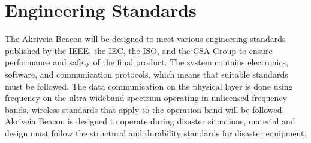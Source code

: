 
\setcounter{section}{2}
\section{Engineering Standards}
\bigskip

The Akriveia Beacon will be designed to meet various engineering standards published by the IEEE, the IEC, the ISO, and the CSA Group to ensure performance and safety of the final product. The system contains electronics, software, and communication protocols, which means that suitable standards must be followed. The data communication on the physical layer is done using frequency on the ultra-wideband spectrum operating in unlicensed frequency bands, wireless standards that apply to the operation band will be followed. Akriveia Beacon is designed to operate during disaster situations, material and design must follow the structural and durability standards for disaster equipment.


